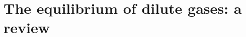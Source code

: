 \documentclass{article}
\begin{document}

\section{The equilibrium of dilute gases: a review}
\end{document}
